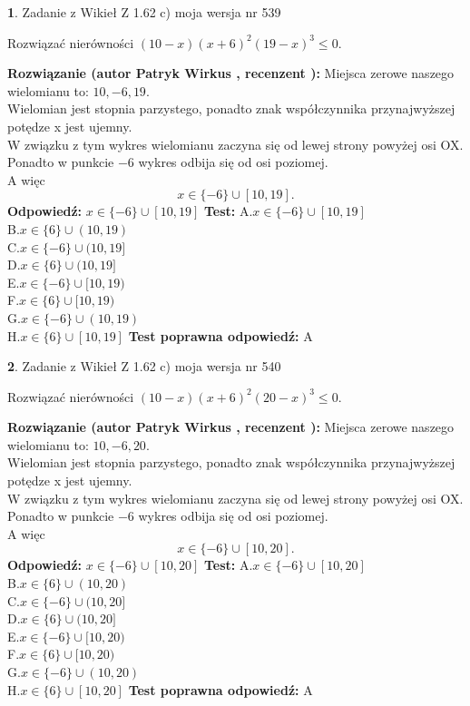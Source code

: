 \documentclass[12pt, a4paper]{article}
\theoremstyle{definition} %
\newtheorem{zad}{}
\newcommand{\zadStart}[1]{\begin{zad}#1\newline}
\newcommand{\zadStop}{\end{zad}}
\newcommand{\rozwStart}[2]{\noindent \textbf{Rozwiązanie (autor #1 , recenzent #2): }\newline}
\newcommand{\rozwStop}{\newline}
\newcommand{\odpStart}{\noindent \textbf{Odpowiedź:}\newline}
\newcommand{\odpStop}{\newline}
\newcommand{\testStart}{\noindent \textbf{Test:}\newline}
\newcommand{\testStop}{\newline}
\newcommand{\kluczStart}{\noindent \textbf{Test poprawna odpowiedź:}\newline}
\newcommand{\kluczStop}{\newline}
\begin{document}
\zadStart{Zadanie z Wikieł Z 1.62 c) moja wersja nr 539}

Rozwiązać nierówności $(10-x)(x+6)^{2}(19-x)^{3}\le0$.
\zadStop
\rozwStart{Patryk Wirkus}{}
Miejsca zerowe naszego wielomianu to: $10, -6, 19$.\\
Wielomian jest stopnia parzystego, ponadto znak współczynnika przy\linebreak najwyższej potędze x jest ujemny.\\ W związku z tym wykres wielomianu zaczyna się od lewej strony powyżej osi OX.\\
Ponadto w punkcie $-6$ wykres odbija się od osi poziomej.\\
A więc $$x \in \{-6\} \cup [10,19].$$
\rozwStop
\odpStart
$x \in \{-6\} \cup [10,19]$
\odpStop
\testStart
A.$x \in \{-6\} \cup [10,19]$\\
B.$x \in \{6\} \cup (10,19)$\\
C.$x \in \{-6\} \cup (10,19]$\\
D.$x \in \{6\} \cup (10,19]$\\
E.$x \in \{-6\} \cup [10,19)$\\
F.$x \in \{6\} \cup [10,19)$\\
G.$x \in \{-6\} \cup (10,19)$\\
H.$x \in \{6\} \cup [10,19]$
\testStop
\kluczStart
A
\kluczStop



\zadStart{Zadanie z Wikieł Z 1.62 c) moja wersja nr 540}

Rozwiązać nierówności $(10-x)(x+6)^{2}(20-x)^{3}\le0$.
\zadStop
\rozwStart{Patryk Wirkus}{}
Miejsca zerowe naszego wielomianu to: $10, -6, 20$.\\
Wielomian jest stopnia parzystego, ponadto znak współczynnika przy\linebreak najwyższej potędze x jest ujemny.\\ W związku z tym wykres wielomianu zaczyna się od lewej strony powyżej osi OX.\\
Ponadto w punkcie $-6$ wykres odbija się od osi poziomej.\\
A więc $$x \in \{-6\} \cup [10,20].$$
\rozwStop
\odpStart
$x \in \{-6\} \cup [10,20]$
\odpStop
\testStart
A.$x \in \{-6\} \cup [10,20]$\\
B.$x \in \{6\} \cup (10,20)$\\
C.$x \in \{-6\} \cup (10,20]$\\
D.$x \in \{6\} \cup (10,20]$\\
E.$x \in \{-6\} \cup [10,20)$\\
F.$x \in \{6\} \cup [10,20)$\\
G.$x \in \{-6\} \cup (10,20)$\\
H.$x \in \{6\} \cup [10,20]$
\testStop
\kluczStart
A
\kluczStop
\end{document}
